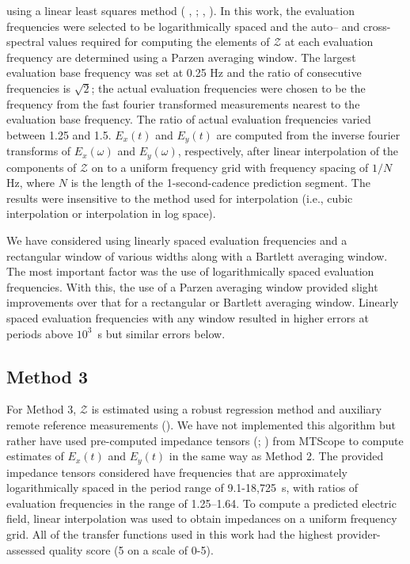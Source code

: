 \documentclass[12pt]{article}
\newcommand{\citeay}[1]{%
\citeauthor{#1}, \citeyear{#1}%
}
\begin{document}
\noindent using a linear least squares method (\citeay{Sims1971}; \citeay{Simpson2005}).  In this work, the evaluation frequencies were selected to be logarithmically spaced and the auto-- and cross-spectral values required for computing the elements of $\mathcal{Z}$ at each evaluation frequency are determined using a Parzen averaging window.  The largest evaluation base frequency was set at 0.25 Hz and the ratio of consecutive frequencies is $\sqrt{2}$; the actual evaluation frequencies were chosen to be the frequency from the fast fourier transformed measurements nearest to the evaluation base frequency. The ratio of actual evaluation frequencies varied between 1.25 and 1.5.  $E_x(t)$ and $E_y(t)$ are computed from the inverse fourier transforms of $E_x(\omega)$ and $E_y(\omega)$, respectively, after linear interpolation of the components of $\mathcal{Z}$ on to a uniform frequency grid with frequency spacing of $1/N$ Hz, where $N$ is the length of the 1-second-cadence prediction segment.  The results were insensitive to the method used for interpolation (i.e., cubic interpolation or interpolation in log space).

We have considered using linearly spaced evaluation frequencies and a rectangular window of various widths along with a Bartlett averaging window.  The most important factor was the use of logarithmically spaced evaluation frequencies.  With this, the use of a Parzen averaging window provided slight improvements over that for a rectangular or Bartlett averaging window.  Linearly spaced evaluation frequencies with any window resulted in higher errors at periods above $10^3$~s but similar errors below.  

\subsection{Method 3}

For Method 3, $\mathcal{Z}$ is estimated using a robust regression method and auxiliary remote reference measurements (\cite{Chave2012}).  We have not implemented this algorithm but rather have used pre-computed impedance tensors (\cite{Kelbert2011}; \cite{Schultz2016}) from MTScope to compute estimates of $E_x(t)$ and $E_y(t)$ in the same way as Method 2.  The provided impedance tensors considered have frequencies that are approximately logarithmically spaced in the period range of 9.1-18,725~s, with ratios of evaluation frequencies in the range of 1.25--1.64.  To compute a predicted electric field, linear interpolation was used to obtain impedances on a uniform frequency grid.  All of the transfer functions used in this work had the highest provider-assessed quality score (5 on a scale of 0-5).
\end{document}

